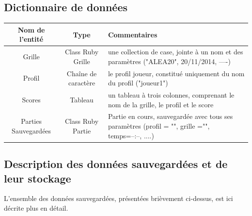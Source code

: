 \documentclass[11pt]{article}
\begin{document}
\subsection{Dictionnaire de données}


\begin{tabular}{|c|c|l|} \hline
    {\bf Nom de l'entité} & {\bf Type } & {\bf Commentaires}\\ \hline
    Grille & Class Ruby Grille & une collection de case, jointe à un nom et des paramètres ("ALEA20", 20/11/2014, ----)\\ \hline
    Profil & Chaîne de caractère & le profil joueur, constitué uniquement du nom du profil ("joueur1")\\ \hline
    Scores & Tableau & un tableau à trois colonnes, comprenant le nom de la grille, le profil et le score\\ \hline
    Parties Sauvegardées & Class Ruby Partie & Partie en cours, sauvegardée avec tous ses paramètres (profil = "", grille ="", temps=--:--, ....) \\ \hline 
\end{tabular}

\subsection{Description des données sauvegardées et de leur stockage}
L'ensemble des données sauvegardées, présentées brièvement ci-dessus, est ici décrite plus en détail.
\end{document}
